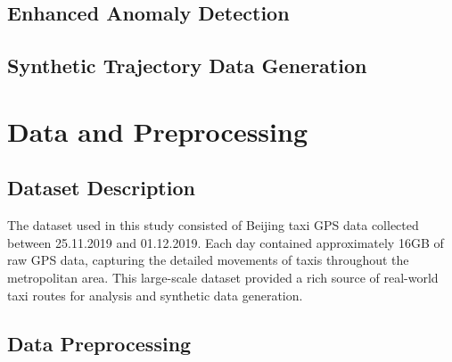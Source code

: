 \documentclass[runningheads]{llncs}
\begin{document}
\subsection{Enhanced Anomaly Detection}
\label{sec:improve}

\begin{compactoutline}
\end{compactoutline}

\subsection{Synthetic Trajectory Data Generation}
\label{sec:synthetic}

\begin{compactoutline}
\end{compactoutline}

\section{Data and Preprocessing}
\label{sec:data-preprocessing}

\subsection{Dataset Description}
\label{sec:data}

The dataset used in this study consisted of Beijing taxi GPS data collected between 25.11.2019 and 01.12.2019. Each day contained approximately 16GB of raw GPS data, capturing the detailed movements of taxis throughout the metropolitan area. This large-scale dataset provided a rich source of real-world taxi routes for analysis and synthetic data generation.

\subsection{Data Preprocessing}
\label{sec:preprocessing}
\end{document}
